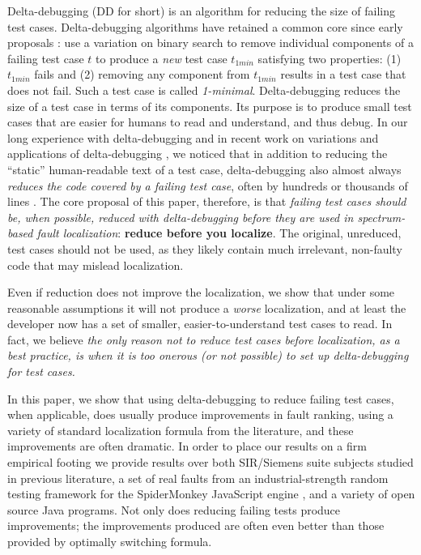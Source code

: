 Delta-debugging \cite{DD} (DD for short) is an algorithm for reducing
the size of failing test cases.  Delta-debugging algorithms have
retained a common core since early proposals \cite{DDISSTA}: use a
variation on binary search to remove individual components of a
failing test case $t$ to produce a \emph{new} test case $t_{1min}$
satisfying two properties: (1) $t_{1min}$ fails and (2) removing any
component from $t_{1min}$ results in a test case that does not fail.
Such a test case is called \emph{1-minimal}. 
Delta-debugging reduces the size of a test case in terms of its
components.  Its purpose is to produce small test cases that are
easier for humans to read and understand, and thus debug.  In our long
experience with delta-debugging \cite{ICSEDiff,AMAI} and in recent
work on variations and applications of delta-debugging
\cite{icst2014,issta14,PLDI13,NonAdeq}, we noticed that in addition to
reducing the ``static'' human-readable text of a test case,
delta-debugging also almost always \emph{reduces the code covered by a
failing test case}, often by hundreds or thousands of lines
\cite{icst2014}.  The core proposal of this paper, therefore, is that
\emph{failing test cases should be, when possible, reduced with
delta-debugging before they are used in spectrum-based fault
localization}: {\bf reduce before you localize}.  The original,
unreduced, test cases should not be used, as they likely contain much
irrelevant, non-faulty code that may mislead localization.

Even if reduction does not improve the localization, we
show that under some reasonable assumptions it will not produce a
\emph{worse} localization, and at least the developer now has a set of
smaller, easier-to-understand test cases to read.  In fact, we believe
\emph{the only reason not to reduce test cases before localization, as a
best practice, is when it is too onerous (or not possible) to set up
delta-debugging for test cases.}

In this paper, we show that using delta-debugging to reduce failing
test cases, when applicable, does usually produce improvements in
fault ranking, using a variety of standard localization formula from
the literature, and these improvements are often dramatic.  In order
to place our results on a firm empirical footing \cite{Threats} we
provide results over both SIR/Siemens \cite{Siemens} suite subjects
studied in previous literature, a set of real faults from an
industrial-strength random testing framework for the SpiderMonkey
JavaScript engine \cite{icst2014,jsfunfuzz}, and a variety of open
source Java programs.  Not only does reducing failing tests produce
improvements; the improvements produced are often even better than
those provided by optimally switching formula.  
